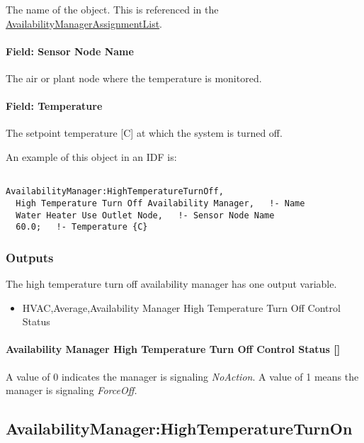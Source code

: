 The name of the object. This is referenced in the \hyperref[availabilitymanagerassignmentlist]{AvailabilityManagerAssignmentList}.

\paragraph{Field: Sensor Node Name}\label{field-sensor-node-name-002}

The air or plant node where the temperature is monitored.

\paragraph{Field: Temperature}\label{field-temperature}

The setpoint temperature {[}C{]} at which the system is turned off.

An example of this object in an IDF is:

\begin{lstlisting}

AvailabilityManager:HighTemperatureTurnOff,
  High Temperature Turn Off Availability Manager,   !- Name
  Water Heater Use Outlet Node,   !- Sensor Node Name
  60.0;   !- Temperature {C}
\end{lstlisting}

\subsubsection{Outputs}\label{outputs-4-017}

The high temperature turn off availability manager has one output variable.

\begin{itemize}
\tightlist
\item
  HVAC,Average,Availability Manager High Temperature Turn Off Control Status
\end{itemize}

\paragraph{Availability Manager High Temperature Turn Off Control Status {[]}}\label{availability-manager-high-temperature-turn-off-control-status}

A value of 0 indicates the manager is signaling \emph{NoAction}. A value of 1 means the manager is signaling \emph{ForceOff.}

\subsection{AvailabilityManager:HighTemperatureTurnOn}\label{availabilitymanagerhightemperatureturnon}

